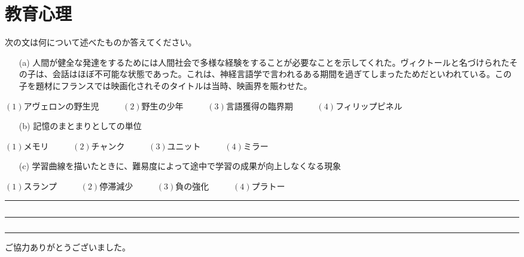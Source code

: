 \documentclass[10pt]{jarticle}
\begin{document}
\section{教育心理}
次の文は何について述べたものか答えてください。
\begin{itemize}
  \item[(a)]人間が健全な発達をするためには人間社会で多様な経験をすることが必要なことを示してくれた。ヴィクトールと名づけられたその子は、会話はほぼ不可能な状態であった。これは、神経言語学で言われるある期間を過ぎてしまったためだといわれている。この子を題材にフランスでは映画化されそのタイトルは当時、映画界を賑わせた。
\end{itemize}
\begin{center}
  $(1)$アヴェロンの野生児 \ \ \ \ \ $(2)$野生の少年 \ \ \ \ \ $(3)$言語獲得の臨界期 \ \ \ \ \  $(4)$フィリップピネル
\end{center}
\begin{itemize}
  \item[(b)]記憶のまとまりとしての単位
\end{itemize}
\begin{center}
  $(1)$メモリ \ \ \ \ \ $(2)$チャンク \ \ \ \ \ $(3)$ユニット \ \ \ \ \  $(4)$ミラー
\end{center}
\begin{itemize}
  \item[(c)]学習曲線を描いたときに、難易度によって途中で学習の成果が向上しなくなる現象
\end{itemize}
\begin{center}
  $(1)$スランプ \ \ \ \ \ $(2)$停滞減少 \ \ \ \ \ $(3)$負の強化 \ \ \ \ \  $(4)$プラトー
\end{center}
\begin{table}[H]
  \centering
    \begin{tabular}{||c||c||c||c||}
      \hline
      \hline
        \ \ \ \ \ \ \ \ \ \ \ \ \ \ \ \ \ \ \ \ \ \ \ \ \ &  \ \ \ \ \ \ \ \ \ \ \ \ \ \ \ \ \ \ \ \ \ \ \ \ \ & \ \ \ \ \ \ \ \ \ \ \ \ \ \ \ \ \ \ \ \ \ \ \ \ \ & \ \ \ \ \ \ \ \ \ \ \ \ \ \ \ \ \ \ \ \ \ \ \ \ \  \\
      \hline
      \hline
        \ \ \ \ \ \ \ \ \ \ \ \ \ \ \ \ \ \ \ \ \ \ \ \ \ &  \ \ \ \ \ \ \ \ \ \ \ \ \ \ \ \ \ \ \ \ \ \ \ \ \ & \ \ \ \ \ \ \ \ \ \ \ \ \ \ \ \ \ \ \ \ \ \ \ \ \ & \ \ \ \ \ \ \ \ \ \ \ \ \ \ \ \ \ \ \ \ \ \ \ \ \  \\
      \hline
      \hline
    \end{tabular}
  \end{table}

ご協力ありがとうございました。
\end{document}
